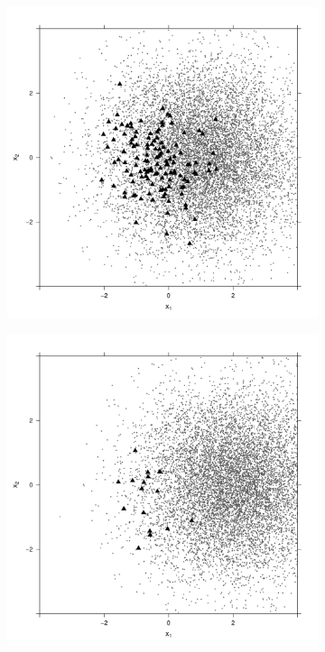 \begin{figure}[htbp]
    \centering
    \begin{subfigure}{0.45\textwidth}
        \includegraphics[width=\textwidth]{results/p1.4_100_1_1h_2s/output/population_and_incidents_scatter}
        \label{fig:one_sample:p1.4_100_Gap_risk:2}
    \end{subfigure}
    \begin{subfigure}{0.45\textwidth}
        \includegraphics[width=\textwidth]{results/p1.4_100_1_1h_4s/output/population_and_incidents_scatter}

\end{subfigure}
\end{figure}
